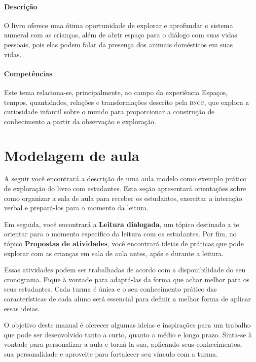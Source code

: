 \documentclass[11pt]{extarticle}
\begin{document}
\paragraph{Descrição} O livro oferece uma ótima oportunidade de explorar 
e aprofundar o sistema numeral com as crianças, além de abrir espaço para o diálogo com suas vidas pessoais, pois elas podem falar da presença dos animais domésticos em suas vidas.

\paragraph{Competências} Este tema relaciona-se, principalmente, ao 
campo da experiência Espaços, tempos, quantidades, relações e transformações 
descrito pela \textsc{bncc}, que explora a curiosidade infantil sobre o mundo 
para proporcionar a construção de conhecimento a partir da observação e exploração.




\section{Modelagem de aula}
A seguir você encontrará a descrição de uma aula modelo como exemplo 
prático de exploração do livro com estudantes. Esta seção apresentará 
orientações sobre como organizar a sala de aula para receber os 
estudantes, exercitar a interação verbal e prepará-los para o 
momento da leitura.

Em seguida, você encontrará a \textbf{Leitura dialogada}, um 
tópico destinado a te orientar para o momento específico da 
leitura com os estudantes. Por fim, no tópico 
\textbf{Propostas de atividades}, você encontrará ideias 
de práticas que pode explorar com as crianças em sala de 
aula antes, após e durante a leitura. 

Essas atividades podem ser trabalhadas de acordo com a 
disponibilidade do seu cronograma. Fique à vontade para adaptá-las 
da forma que achar melhor para os seus estudantes. Cada turma é única 
e o seu conhecimento prático das características de cada aluno será 
essencial para definir a melhor forma de aplicar essas ideias. 

O objetivo deste manual é oferecer algumas ideias 
e inspirações para um trabalho que pode ser desenvolvido tanto 
a curto, quanto a médio e longo prazo. Sinta-se à vontade para 
personalizar a aula e torná-la sua, aplicando seus conhecimentos, sua 
personalidade e aproveite para fortalecer 
seu vínculo com a turma.
\end{document}
